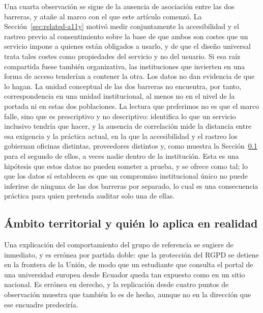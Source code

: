\documentclass[pdflatex,sn-basic,Numbered,iicol]{sn-jnl}
\theoremstyle{thmstyleone}
\theoremstyle{thmstyletwo}
\theoremstyle{thmstylethree}
\begin{document}
Una cuarta observaci\'on se sigue de la ausencia de asociaci\'on entre las dos barreras, y ata\~ne al marco con el que este art\'iculo comenz\'o. La Secci\'on~\ref{sec:related-a11y} motiv\'o medir conjuntamente la accesibilidad y el rastreo previo al consentimiento sobre la base de que ambos son costes que un servicio impone a quienes est\'an obligados a usarlo, y de que el dise\~no universal trata tales costes como propiedades del servicio y no del usuario. Si esa ra\'iz compartida fuese tambi\'en organizativa, las instituciones que invierten en una forma de acceso tender\'ian a contener la otra. Los datos no dan evidencia de que lo hagan. La unidad conceptual de las dos barreras no encuentra, por tanto, correspondencia en una unidad institucional, al menos no en el nivel de la portada ni en estas dos poblaciones. La lectura que preferimos no es que el marco falle, sino que es prescriptivo y no descriptivo: identifica lo que un servicio inclusivo tendr\'ia que hacer, y la ausencia de correlaci\'on mide la distancia entre esa exigencia y la pr\'actica actual, en la que la accesibilidad y el rastreo los gobiernan oficinas distintas, proveedores distintos y, como muestra la Secci\'on~\ref{sec:discussion-legal} para el segundo de ellos, a veces nadie dentro de la instituci\'on. Esta es una hip\'otesis que estos datos no pueden someter a prueba, y se ofrece como tal; lo que los datos s\'i establecen es que un compromiso institucional \'unico no puede inferirse de ninguna de las dos barreras por separado, lo cual es una consecuencia pr\'actica para quien pretenda auditar solo una de ellas.

\subsection{\'Ambito territorial y qui\'en lo aplica en realidad}\label{sec:discussion-legal}

Una explicaci\'on del comportamiento del grupo de referencia se sugiere de inmediato, y es err\'onea por partida doble: que la protecci\'on del RGPD se detiene en la frontera de la Uni\'on, de modo que un estudiante que consulta el portal de una universidad europea desde Ecuador queda tan expuesto como en un sitio nacional. Es err\'onea en derecho, y la replicaci\'on desde cuatro puntos de observaci\'on muestra que tambi\'en lo es de hecho, aunque no en la direcci\'on que ese encuadre predecir\'ia.
\end{document}
